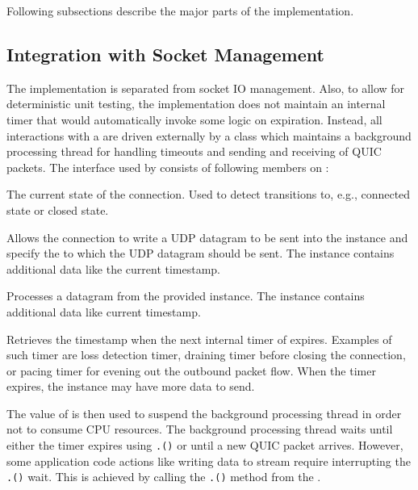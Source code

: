 Following subsections describe the major parts of the implementation.

\subsection{Integration with Socket Management}

The \ManagedQuicConnection{} implementation is separated from socket IO management. Also, to allow
for deterministic unit testing, the implementation does not maintain an internal timer that would
automatically invoke some logic on expiration. Instead, all interactions with a \Socket{} are driven
externally by a \QuicConnectionContext{} class which maintains a background processing thread for
handling timeouts and sending and receiving of QUIC packets. The interface used by
\QuicConnectionContext{} consists of following members on \ManagedQuicConnection{}:

\begin{description}

   The current state of the connection. Used to detect transitions to, e.g., connected state or closed state.

  Allows the connection to write a UDP datagram to be sent into the \QuicWriter{} instance and specify the  to which the UDP datagram should be sent. The  instance contains additional data like the current timestamp.

  Processes a datagram from the provided \QuicReader{} instance. The  instance contains additional data like current timestamp.

  Retrieves the timestamp when the next internal timer of expires. Examples of such timer are loss detection timer, draining timer before closing the connection, or pacing timer for evening out the outbound packet flow. When the timer expires, the \ManagedQuicConnection{} instance may have more data to send.

\end{description}

The value of  is then used to suspend the background processing thread
in order not to consume CPU resources. The background processing thread waits until either the timer
expires using \texttt{.()} or until a new QUIC packet arrives. However,
some application code actions like writing data to stream require interrupting the
\texttt{.()} wait. This is achieved by calling the
\texttt{\QuicConnectionContext{}.()} method from the \ManagedQuicConnection{}.

